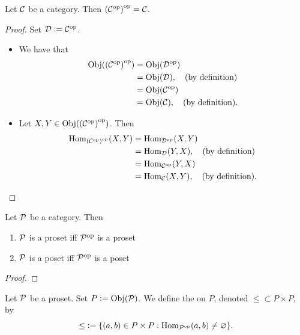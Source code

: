 \documentclass{book}
\begin{document}
	\begin{ex} 
		Let $\mathcal{C}$ be a category. Then ${({\mathcal{C}}^{\text{op}})}^{\text{op}}  = \mathcal{C}$. 
	\end{ex}
	
	\begin{proof}
		Set $\mathcal{D} \vcentcolon= {\mathcal{C}}^{\text{op}}$.
		\begin{itemize}
			\item We have that
			\begin{align*}
				\operatorname{Obj}({({\mathcal{C}}^{\text{op}})}^{\text{op}} )
				& = \operatorname{Obj}({\mathcal{D}}^{\text{op}}) \\
				& = \operatorname{Obj}(\mathcal{D}), \quad \text{(by definition)} \\
				& = \operatorname{Obj}({\mathcal{C}}^{\text{op}}) \\
				& = \operatorname{Obj}(\mathcal{C}), \quad \text{(by definition)}. 
			\end{align*}
			\item Let $X,Y \in \operatorname{Obj}({({\mathcal{C}}^{\text{op}})}^{\text{op}} )$. Then
			\begin{align*}
				\operatorname{Hom}_{{({\mathcal{C}}^{\text{op}})}^{\text{op}} }(X, Y) 
				& = \operatorname{Hom}_{{\mathcal{D}}^{\text{op}}}(X, Y) \\
				& = \operatorname{Hom}_{\mathcal{D}}(Y, X), \quad \text{(by definition)} \\
				& = \operatorname{Hom}_{{\mathcal{C}}^{\text{op}}}(Y, X) \\
				& = \operatorname{Hom}_{\mathcal{C}}(X, Y), \quad \text{(by definition)}.
			\end{align*}
		\end{itemize}
	\end{proof}

	\begin{ex}
		Let $\mathcal{P}$ be a category. Then 
		\begin{enumerate}
			\item $\mathcal{P}$ is a proset iff ${\mathcal{P}}^{\text{op}}$ is a proset
			\item $\mathcal{P}$ is a poset iff ${\mathcal{P}}^{\text{op}}$ is a poset
		\end{enumerate} 
	\end{ex}

	\begin{proof}
	\end{proof}

	\begin{defn}
		Let $\mathcal{P}$ be a proset. Set $P \vcentcolon= \operatorname{Obj}(\mathcal{P})$. We define the  on $P$, denoted ${\leq} \subset P \times P$, by 
		$${\leq} \vcentcolon= \{(a,b) \in P \times P: \operatorname{Hom}_{{\mathcal{P}}^{\text{op}}}(a,b) \neq \varnothing\}.$$
	\end{defn}
\end{document}
